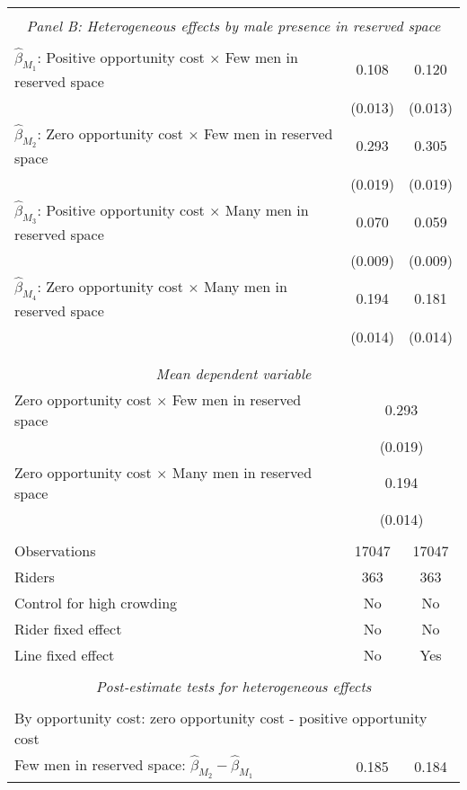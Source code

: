 \begin{tabular}{l*{2}{c}}
\hline \\[-1ex] \multicolumn{3}{c}{\textit{Panel B: Heterogeneous effects by male presence in reserved space}} \\\\[-1ex]
$\hat\beta_{M_1}$: Positive opportunity cost $\times$ Few men in reserved space&       0.108\sym{***}&       0.120\sym{***}\\
                    &     (0.013)         &     (0.013)         \\
[1em]
$\hat\beta_{M_2}$: Zero opportunity cost $\times$ Few men in reserved space&       0.293\sym{***}&       0.305\sym{***}\\
                    &     (0.019)         &     (0.019)         \\
[1em]
$\hat\beta_{M_3}$: Positive opportunity cost $\times$ Many men in reserved space&       0.070\sym{***}&       0.059\sym{***}\\
                    &     (0.009)         &     (0.009)         \\
[1em]
$\hat\beta_{M_4}$: Zero opportunity cost $\times$ Many men in reserved space&       0.194\sym{***}&       0.181\sym{***}\\
                    &     (0.014)         &     (0.014)         \\
\\[-1.8ex] \hline \\[-1.8ex] \multicolumn{3}{c}{\textit{Mean dependent variable}} \\ Zero opportunity cost $\times$ Few men in reserved space & \multicolumn{2}{c}{0.293} \\ & \multicolumn{2}{c}{(0.019)} \\ Zero opportunity cost $\times$ Many men in reserved space & \multicolumn{2}{c}{0.194} \\ & \multicolumn{2}{c}{(0.014)} \\\\[-1ex] 
Observations        &       17047         &       17047         \\
Riders              &         363         &         363         \\
Control for high crowding&          No         &          No         \\
Rider fixed effect  &          No         &          No         \\
Line fixed effect   &          No         &         Yes         \\
\hline \\[-1ex]  \multicolumn{3}{c}{\textit{Post-estimate tests for heterogeneous effects}} \\\\[-1ex] \multicolumn{3}{l}{By opportunity cost: zero opportunity cost - positive opportunity cost} \\ \quad Few men in reserved space: $\hat\beta_{M_2} - \hat\beta_{M_1}$&       0.185         &       0.184         \\

\end{tabular}
